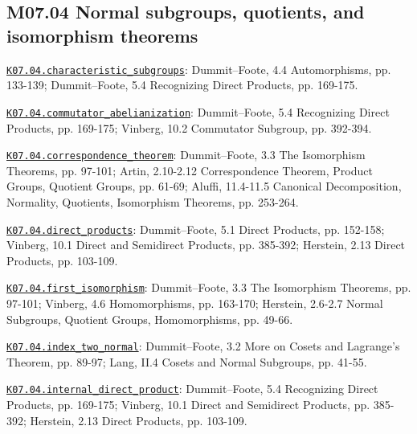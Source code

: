 \subsection*{M07.04 Normal subgroups, quotients, and isomorphism theorems}
\par\smallskip\noindent\hypertarget{src:K07.04.characteristic_subgroups}{}\label{src:K07.04.characteristic_subgroups}\hyperref[K07.04.characteristic_subgroups]{\texttt{K07.04.characteristic\_subgroups}}: Dummit--Foote, 4.4 Automorphisms, pp. 133-139; Dummit--Foote, 5.4 Recognizing Direct Products, pp. 169-175.
\par\smallskip\noindent\hypertarget{src:K07.04.commutator_abelianization}{}\label{src:K07.04.commutator_abelianization}\hyperref[K07.04.commutator_abelianization]{\texttt{K07.04.commutator\_abelianization}}: Dummit--Foote, 5.4 Recognizing Direct Products, pp. 169-175; Vinberg, 10.2 Commutator Subgroup, pp. 392-394.
\par\smallskip\noindent\hypertarget{src:K07.04.correspondence_theorem}{}\label{src:K07.04.correspondence_theorem}\hyperref[K07.04.correspondence_theorem]{\texttt{K07.04.correspondence\_theorem}}: Dummit--Foote, 3.3 The Isomorphism Theorems, pp. 97-101; Artin, 2.10-2.12 Correspondence Theorem, Product Groups, Quotient Groups, pp. 61-69; Aluffi, 11.4-11.5 Canonical Decomposition, Normality, Quotients, Isomorphism Theorems, pp. 253-264.
\par\smallskip\noindent\hypertarget{src:K07.04.direct_products}{}\label{src:K07.04.direct_products}\hyperref[K07.04.direct_products]{\texttt{K07.04.direct\_products}}: Dummit--Foote, 5.1 Direct Products, pp. 152-158; Vinberg, 10.1 Direct and Semidirect Products, pp. 385-392; Herstein, 2.13 Direct Products, pp. 103-109.
\par\smallskip\noindent\hypertarget{src:K07.04.first_isomorphism}{}\label{src:K07.04.first_isomorphism}\hyperref[K07.04.first_isomorphism]{\texttt{K07.04.first\_isomorphism}}: Dummit--Foote, 3.3 The Isomorphism Theorems, pp. 97-101; Vinberg, 4.6 Homomorphisms, pp. 163-170; Herstein, 2.6-2.7 Normal Subgroups, Quotient Groups, Homomorphisms, pp. 49-66.
\par\smallskip\noindent\hypertarget{src:K07.04.index_two_normal}{}\label{src:K07.04.index_two_normal}\hyperref[K07.04.index_two_normal]{\texttt{K07.04.index\_two\_normal}}: Dummit--Foote, 3.2 More on Cosets and Lagrange's Theorem, pp. 89-97; Lang, II.4 Cosets and Normal Subgroups, pp. 41-55.
\par\smallskip\noindent\hypertarget{src:K07.04.internal_direct_product}{}\label{src:K07.04.internal_direct_product}\hyperref[K07.04.internal_direct_product]{\texttt{K07.04.internal\_direct\_product}}: Dummit--Foote, 5.4 Recognizing Direct Products, pp. 169-175; Vinberg, 10.1 Direct and Semidirect Products, pp. 385-392; Herstein, 2.13 Direct Products, pp. 103-109.
